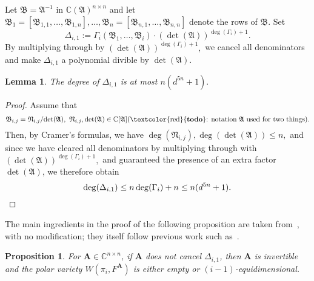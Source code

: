 \documentclass[12pt]{article}
\def\fB{{\mathfrak B}}
\def\fN{{\mathfrak N}}
\def\A{\mathfrak{A}}
\def\mA{{\bm A}}
\def\D{\Delta}
\def\C{\mathbb{C}}
\newcommand\todo[1]{(\textcolor{red}{{\bf todo}}: #1)}
\def\gi{\Gamma_i}
\newtheorem{lemma}[theorem]{Lemma}
\newtheorem{prop}[theorem]{Proposition}
\begin{document}
Let $\fB=\A^{-1}$ in $\C(\A)^{n \times n}$ and let
$\fB_1=[\fB_{1,1},\hdots,\fB_{1,n}],\hdots,\fB_n=[\fB_{n,1},\hdots,\fB_{n,n}]$
denote the rows of $\fB.$ Set
\[
\Delta_{i,1} := \Gamma_i(\fB_1,\hdots,\fB_i)\cdot (\det( \A))^{\deg (\gi)+1}. 
\]
By multiplying through by $(\det( \A))^{\deg( \gi)+1},$ we cancel all
denominators and make $\D_{i,1}$ a polynomial divible by $\det(\A)$.
\begin{lemma}
  The degree of $\Delta_{i,1}$ is at most $n(d^{5n}+1).$
\end{lemma}
\begin{proof}
  Assume that 
  \[
  \fB_{i,j}=\fN_{i,j}/{\rm det}(\A),~ \fN_{i,j},\det(\A)\in \C[\A] \text{\todo{notation $\A$ used for two things}}.
  \]
  Then, by Cramer's formulas, we have $\deg( \fN_{i,j}),\deg(\det(\A))
  \leq n,$ and since we have cleared all denominators by multiplying
  through with $(\det( \A))^{\deg (\gi)+1},$ and guaranteed the
  presence of an extra factor $\det(\A)$, we therefore obtain
  \[
  \deg( \Delta_{i,1}) \leq n\deg( \gi) + n \leq n(d^{5n}+1). \qedhere
  \]
\end{proof}
The main ingredients in the proof of the following proposition are
taken from~\cite{TWT}, with no modification; they itself follow
previous work such as~\cite{BaGiHeSaSh10}.
\begin{prop}
  For $\mA \in \C^{n\times n}$, if $\mA$ does not cancel $\D_{i,1}$,
  then $\mA$ is invertible and the polar variety $W(\pi_i,F^\mA)$ is
  either empty or $(i-1)$-equidimensional.
\end{prop}
\end{document}
